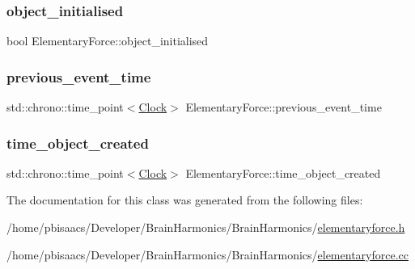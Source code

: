 \subsubsection{\texorpdfstring{object\+\_\+initialised}{object\_initialised}}
{\footnotesize\ttfamily bool Elementary\+Force\+::object\+\_\+initialised\hspace{0.3cm}{\ttfamily [private]}}

\mbox{\label{classElementaryForce_ae61e8203d30c535260a473b0044e0070}} 
\subsubsection{\texorpdfstring{previous\+\_\+event\+\_\+time}{previous\_event\_time}}
{\footnotesize\ttfamily std\+::chrono\+::time\+\_\+point$<$\mbox{\hyperlink{universe_8h_a0ef8d951d1ca5ab3cfaf7ab4c7a6fd80}{Clock}}$>$ Elementary\+Force\+::previous\+\_\+event\+\_\+time\hspace{0.3cm}{\ttfamily [private]}}

\mbox{\label{classElementaryForce_a3c0db9aacae297a036837e127a49741d}} 
\subsubsection{\texorpdfstring{time\+\_\+object\+\_\+created}{time\_object\_created}}
{\footnotesize\ttfamily std\+::chrono\+::time\+\_\+point$<$\mbox{\hyperlink{universe_8h_a0ef8d951d1ca5ab3cfaf7ab4c7a6fd80}{Clock}}$>$ Elementary\+Force\+::time\+\_\+object\+\_\+created\hspace{0.3cm}{\ttfamily [private]}}



The documentation for this class was generated from the following files\+:\begin{DoxyCompactItemize}
\item 
/home/pbisaacs/\+Developer/\+Brain\+Harmonics/\+Brain\+Harmonics/\mbox{\hyperlink{elementaryforce_8h}{elementaryforce.\+h}}\item 
/home/pbisaacs/\+Developer/\+Brain\+Harmonics/\+Brain\+Harmonics/\mbox{\hyperlink{elementaryforce_8cc}{elementaryforce.\+cc}}\end{DoxyCompactItemize}
